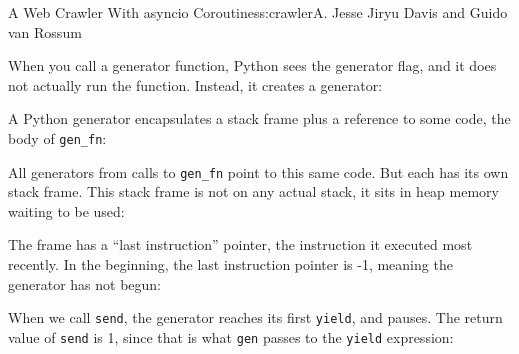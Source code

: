 \begin{aosachapter}{A Web Crawler With asyncio Coroutines}{s:crawler}{A. Jesse Jiryu Davis and Guido van Rossum}
\begin{Shaded}
\begin{Highlighting}[]
\NormalTok{>>> }
 \NormalTok{<< }
\NormalTok{>>> }
\end{Highlighting}
\end{Shaded}

When you call a generator function, Python sees the generator flag, and
it does not actually run the function. Instead, it creates a generator:

\begin{Shaded}
\begin{Highlighting}[]
\NormalTok{>>> }
\NormalTok{<} \NormalTok{>}
\end{Highlighting}
\end{Shaded}

A Python generator encapsulates a stack frame plus a reference to some
code, the body of \texttt{gen\_fn}:

\begin{Shaded}
\begin{Highlighting}[]
\end{Highlighting}
\end{Shaded}

All generators from calls to \texttt{gen\_fn} point to this same code.
But each has its own stack frame. This stack frame is not on any actual
stack, it sits in heap memory waiting to be used:


The frame has a ``last instruction'' pointer, the instruction it
executed most recently. In the beginning, the last instruction pointer
is -1, meaning the generator has not begun:

\begin{Shaded}
\begin{Highlighting}[]
\NormalTok{-}
\end{Highlighting}
\end{Shaded}

When we call \texttt{send}, the generator reaches its first
\texttt{yield}, and pauses. The return value of \texttt{send} is 1,
since that is what \texttt{gen} passes to the \texttt{yield} expression:


\end{aosachapter}
